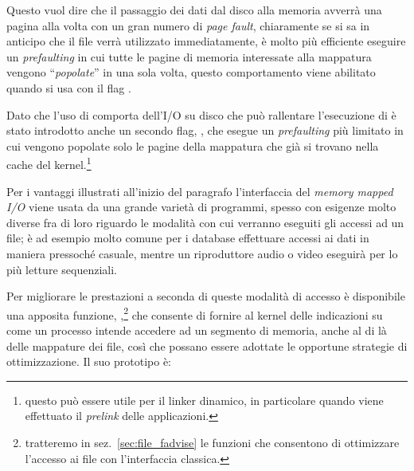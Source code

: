 Questo vuol dire che il passaggio dei dati dal disco alla memoria avverrà una
pagina alla volta con un gran numero di \textit{page fault}, chiaramente se si
sa in anticipo che il file verrà utilizzato immediatamente, è molto più
efficiente eseguire un \textit{prefaulting} in cui tutte le pagine di memoria
interessate alla mappatura vengono ``\textsl{popolate}'' in una sola volta,
questo comportamento viene abilitato quando si usa con  il flag
.

Dato che l'uso di  comporta dell'I/O su disco che può
rallentare l'esecuzione di  è stato introdotto anche un secondo
flag, , che esegue un \textit{prefaulting} più limitato
in cui vengono popolate solo le pagine della mappatura che già si trovano
nella cache del kernel.\footnote{questo può essere utile per il linker
  dinamico, in particolare quando viene effettuato il \textit{prelink} delle
  applicazioni.}


Per i vantaggi illustrati all'inizio del paragrafo l'interfaccia del
\textit{memory mapped I/O} viene usata da una grande varietà di programmi,
spesso con esigenze molto diverse fra di loro riguardo le modalità con cui
verranno eseguiti gli accessi ad un file; è ad esempio molto comune per i
database effettuare accessi ai dati in maniera pressoché casuale, mentre un
riproduttore audio o video eseguirà per lo più letture sequenziali.


Per migliorare le prestazioni a seconda di queste modalità di accesso è
disponibile una apposita funzione, ,\footnote{tratteremo in
  sez.~\ref{sec:file_fadvise} le funzioni che consentono di ottimizzare
  l'accesso ai file con l'interfaccia classica.} che consente di fornire al
kernel delle indicazioni su come un processo intende accedere ad un segmento
di memoria, anche al di là delle mappature dei file, così che possano essere
adottate le opportune strategie di ottimizzazione. Il suo prototipo è:

